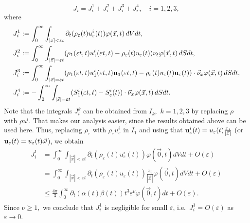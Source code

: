 \documentclass[reqno]{article}%
\theoremstyle{plain}
\theoremstyle{definition}
\theoremstyle{remark}
\numberwithin{equation}{section}
\begin{document}
\[J_i=J_i^1+J_i^2+J_i^3+J_i^4, \quad i=1,2,3,\]
where
\[\begin{split}
J_i^1&:=\int_0^\infty\int_{|\vec{x}|< \varepsilon t} \partial_t(\rho_\varepsilon(t) u^i_\varepsilon(t))\varphi(\vec{x},t)\,dVdt,\\
J_i^2&:=\int_0^\infty\int_{|\vec{x}|= \varepsilon t} (\rho_1(\varepsilon t,t)u_1^i(\varepsilon t,t)-\rho_\varepsilon(t)u_\varepsilon(t))\nu_t \varphi(\vec{x},t)\,dSdt,\\
J_i^3&:=\int_0^\infty\int_{|\vec{x}|= \varepsilon t} (\rho_1(\varepsilon t,t)u_1^i(\varepsilon t,t){\bf u_1}(\varepsilon t,t)-\rho_\varepsilon(t)u_\varepsilon(t){\bf u}_\varepsilon(t))\cdot \vec{\nu}_x \varphi(\vec{x},t)\,dSdt,\\
J_i^4&:=- \int_0^\infty\int_{|\vec{x}|= \varepsilon t} (S^i_1(\varepsilon t,t)-S^i_\varepsilon(t))\cdot\vec{\nu}_x \varphi(\vec{x},t)\,dSdt.
\end{split}\]
Note that the integrals $J_i^k$  can be obtained from $I_k,$ $k=1,2,3$ by replacing $\rho$ with $\rho u^i$. That makes our analysis easier, since the results obtained above can be used here. Thus, replacing $\rho_\varepsilon$ with $\rho_\varepsilon u_\varepsilon^i$ in $I_1$ and using that ${\bf u}^i_\varepsilon(t)=u_\varepsilon(t)\frac{x_i}{|\vec{x}|}$ (or ${\bf u}_\varepsilon(t)=u_\varepsilon(t)\vec{\omega}$), we obtain
\[\begin{split}
J_i^1&=\int_0^\infty\int_{|\vec{x}|<\varepsilon t} \partial_t (\rho_\varepsilon(t)u^i_\varepsilon(t))\varphi(\vec{0},t) dVdt+O(\varepsilon)\\
&=\int_0^\infty\int_{|\vec{x}|<\varepsilon t} \partial_t (\rho_\varepsilon(t)u_\varepsilon(t))\frac{x_i}{|\vec{x}|}\varphi(\vec{0},t) dVdt+O(\varepsilon)\\
&\leq \frac{4\pi}{3}\int_0^\infty \partial_t(\alpha(t)\beta(t))t^3\varepsilon^\nu\varphi(\vec{0},t)dt+O(\varepsilon).
\end{split}\]
Since $\nu\geq 1,$ we conclude that $J_i^1$ is negligible for small $\varepsilon$, i.e.\ $J_i^1=O(\varepsilon)$ as $\varepsilon\to 0$.

\medskip


\medskip
\end{document}
